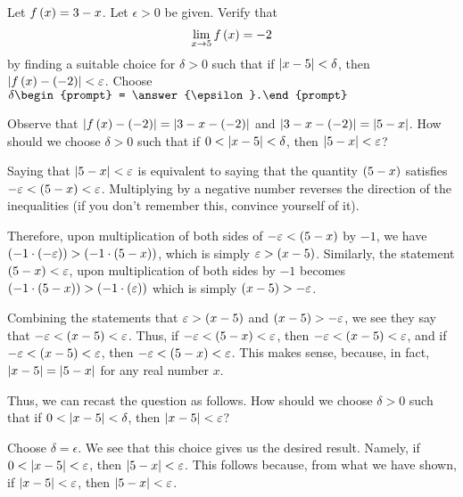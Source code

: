 \documentclass{ximera}
\author{Gregory Hartman \and Matthew Carr}
\begin{document}
\begin{exercise}



Let $f\left(x\right)=3-x$. Let $\epsilon>0$ be given. Verify that
\[
\lim_{x\to5}f\p{x}=-2
\]
by finding a suitable choice for $\delta>0$ such that if $\left|x-5\right|<\delta$, then $\left|f\left(x\right)-\left(-2\right)\right|<\varepsilon$. Choose $\delta\begin{prompt} = \answer{\epsilon}.\end{prompt}$

 \begin{hint}
 Observe that $\left|f\left(x\right)-\left(-2\right)\right|=\left|3-x-\left(-2\right)\right|$ and $\left|3-x-\left(-2\right)\right|=\left|5-x\right|$. How should we choose $\delta>0$ such that if $0<\left|x-5\right|<\delta$, then $\left|5-x\right|<\varepsilon$?
 \end{hint}
 \begin{hint}
 Saying that $\left|5-x\right|<\varepsilon$ is equivalent to saying that the quantity $\left(5-x\right)$ satisfies $-\varepsilon<\left(5-x\right)<\varepsilon$. Multiplying by a negative number reverses the direction of the inequalities (if you don't remember this, convince yourself of it).
 
 Therefore, upon multiplication of both sides of $-\varepsilon<\left(5-x\right)$ by $-1$, we have $\left(-1\cdot\left(-\varepsilon\right)\right)>\left(-1\cdot\left(5-x\right)\right)$, which is simply $\varepsilon>\left(x-5\right)$. Similarly, the statement $\left(5-x\right)<\varepsilon$, upon multiplication of both sides by $-1$ becomes $\left(-1\cdot\left(5-x\right)\right)>\left(-1\cdot\left(\varepsilon\right)\right)$ which is simply $\left(x-5\right)>-\varepsilon$.
 \end{hint}
 \begin{hint}
 Combining the statements that $\varepsilon>\left(x-5\right)$ and $\left(x-5\right)>-\varepsilon$, we see they say that $-\varepsilon<\left(x-5\right)<\varepsilon$. Thus, if $-\varepsilon<\left(5-x\right)<\varepsilon$, then $-\varepsilon<\left(x-5\right)<\varepsilon$, and if $-\varepsilon<\left(x-5\right)<\varepsilon$, then $-\varepsilon<\left(5-x\right)<\varepsilon$. This makes sense, because, in fact, $\left|x-5\right|=\left|5-x\right|$ for any real number $x$. 
 
 Thus, we can recast the question as follows. How should we choose $\delta>0$ such that if $0<\left|x-5\right|<\delta$, then $\left|x-5\right|<\varepsilon$?
 \end{hint}
 \begin{hint}
 Choose $\delta=\epsilon$. We see that this choice gives us the desired result. Namely, if $0<\left|x-5\right|<\varepsilon$, then $\left|5-x\right|<\varepsilon$. This follows because, from what we have shown, if $\left|x-5\right|<\varepsilon$, then $\left|5-x\right|<\varepsilon$.
 \end{hint}
\end{exercise}
\end{document}
